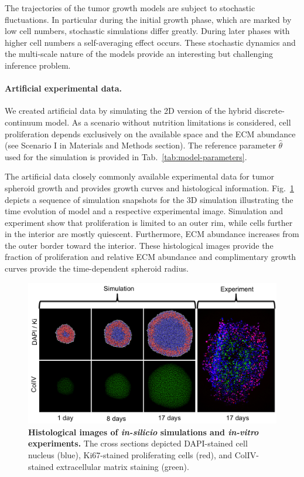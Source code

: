 \documentclass[10pt,letterpaper]{article}
\newcommand{\nj}[1]{{\color{blue}#1}}
\begin{document}
The trajectories of the tumor growth models are subject to stochastic fluctuations. In particular during the initial growth phase, which are marked by low cell numbers, stochastic simulations differ greatly. During later phases with higher cell numbers a self-averaging effect occurs. These stochastic dynamics and the multi-scale nature of the models provide an interesting but challenging inference problem.

\paragraph{Artificial experimental data.}
We created artificial data by simulating \nj{the 2D version} of the hybrid discrete-continuum model. As a scenario without nutrition limitations is considered, cell proliferation depends exclusively on the available space and the ECM abundance (see Scenario I in Materials and Methods section). The reference parameter $\hat{\theta}$ used for the simulation is provided in Tab.~\ref{tab:model-parameters}.

The artificial data closely commonly available experimental data for tumor spheroid growth and provides growth curves and histological information. Fig.~\ref{fig: illustration of artificial and experimental data} depicts a sequence of simulation snapshots for the 3D simulation illustrating the time evolution of model and a respective experimental image. Simulation and experiment show that proliferation is limited to an outer rim, while cells further in the interior are mostly quiescent. Furthermore, ECM abundance increases from the outer border toward the interior. These histological images provide the fraction of proliferation and relative ECM abundance and complimentary growth curves provide the time-dependent spheroid radius.

\begin{figure}[!t]
\includegraphics[width=\textwidth]{Figures/SimulationSnapshots}
\caption{{\bf Histological images of \textit{in-silicio} simulations and \textit{in-vitro} experiments.}
The cross sections depicted DAPI-stained cell nucleus (blue), Ki67-stained proliferating cells (red), and ColIV-stained extracellular matrix staining (green).}
\label{fig: illustration of artificial and experimental data}
\end{figure}
\end{document}
